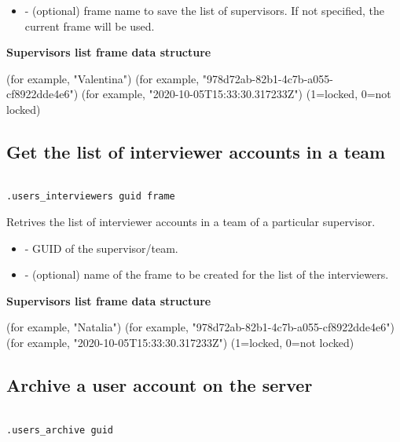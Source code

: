 \paramsheader
\begin{itemize}

    \item {} - (optional) frame name to save the list of supervisors.
    If not specified, the current frame will be used.

\end{itemize}
\textbf{Supervisors list frame data structure}

\begin{compactitem}
     (for example, "Valentina")
     (for example, "978d72ab-82b1-4c7b-a055-cf8922dde4e6")
     (for example, "2020-10-05T15:33:30.317233Z")
     (1=locked, 0=not locked)
\end{compactitem}

\subsection{Get the list of interviewer accounts in a team}
\begin{lstlisting}[style=CommandLineStyle, showlines=true]

.users_interviewers guid frame

\end{lstlisting}

Retrives the list of interviewer accounts in a team of a particular supervisor.

\paramsheader
\begin{itemize}
  \item {} - GUID of the supervisor/team.
  \item {} - (optional) name of the frame to be created for the
  list of the interviewers.
\end{itemize}

\textbf{Supervisors list frame data structure}

\begin{compactitem}
     (for example, "Natalia")
     (for example, "978d72ab-82b1-4c7b-a055-cf8922dde4e6")
     (for example, "2020-10-05T15:33:30.317233Z")
     (1=locked, 0=not locked)
\end{compactitem}


\subsection{Archive a user account on the server}
\begin{lstlisting}[style=CommandLineStyle, showlines=true]

.users_archive guid

\end{lstlisting}

